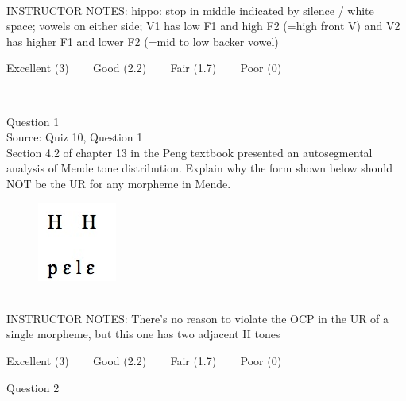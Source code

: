 \documentclass[12pt]{article}
\begin{document}
~\\
INSTRUCTOR NOTES: hippo: stop in middle indicated by silence / white space; vowels on either side; V1 has low F1 and high F2 (=high front V) and V2 has higher F1 and lower F2 (=mid to low backer vowel)


\vfill
Excellent (3) ~~~ Good (2.2) ~~~ Fair (1.7) ~~~ Poor (0)
\newpage

\begin{center}
\textbf{{\color{red}{\HUGE END OF EXAM}}}\\

\end{center}
\newpage

\begin{center}
\textbf{{\color{blue}{\HUGE START OF EXAM\\}}}

\textbf{{\color{blue}{\HUGE Student ID: 5581\\}}}

\textbf{{\color{blue}{\HUGE 3:40 - 4:00 PM\\}}}

\end{center}
\newpage

{\large Question 1}\\

Source: Quiz 10, Question 1\\

Section 4.2 of chapter 13 in the Peng textbook presented an autosegmental analysis of Mende tone distribution. Explain why the form shown below should NOT be the UR for any morpheme in Mende.\\

\begin{figure}[H]
\includegraphics{../images/mende_house_b.png}
\end{figure}

~\\
INSTRUCTOR NOTES: There's no reason to violate the OCP in the UR of a single morpheme, but this one has two adjacent H tones


\vfill
Excellent (3) ~~~ Good (2.2) ~~~ Fair (1.7) ~~~ Poor (0)
\newpage

{\large Question 2}\\
\end{document}

